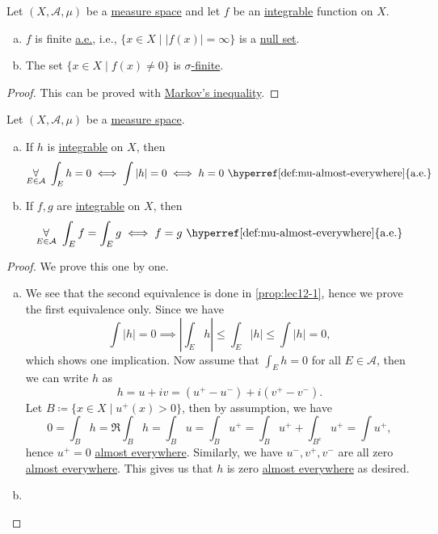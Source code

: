 \begin{lemma}\label{lma:lec-13-2}
	Let \((X, \mathcal{A} , \mu )\) be a \hyperref[def:measure-space]{measure space} and let \(f\) be an \hyperref[def:integrable]{integrable} function on \(X\).
	\begin{enumerate}[(a)]
		\item \(f\) is finite \hyperref[def:mu-almost-everywhere]{a.e.}, i.e., \(\{x\in X \mid \left\vert f(x) \right\vert = \infty \}\) is a \hyperref[def:mu-null-set]{null set}.
		\item The set \(\{x\in X \mid f(x)\neq 0\}\) is \hyperref[def:finite-measure]{\(\sigma \)-finite}.
	\end{enumerate}
\end{lemma}
\begin{proof}
	This can be proved with \hyperref[lma:Markov-inequality]{Markov's inequality}.
\end{proof}

\begin{proposition}\label{prop:lec-13}
	Let \((X, \mathcal{A} , \mu )\) be a \hyperref[def:measure-space]{measure space}.
	\begin{enumerate}[(a)]
		\item If \(h\) is \hyperref[def:integrable]{integrable} on \(X\), then
		      \[
			      \underset{E\in \mathcal{A} }{\forall }\ \int_E h = 0 \iff \int \left\vert h \right\vert = 0 \iff h = 0 \text{ \hyperref[def:mu-almost-everywhere]{a.e.}}
		      \]
		\item If \(f, g\) are \hyperref[def:integrable]{integrable} on \(X\), then
		      \[
			      \underset{E\in \mathcal{A} }{\forall }\ \int _E f = \int _E g \iff f = g \text{ \hyperref[def:mu-almost-everywhere]{a.e.}}
		      \]
	\end{enumerate}
\end{proposition}
\begin{proof}
	We prove this one by one.
	\begin{enumerate}[(a)]
		\item We see that the second equivalence is done in \autoref{prop:lec12-1}, hence we prove the first equivalence only. Since we have
		      \[
			      \int \left\vert h \right\vert = 0 \implies \left\vert \int _E h \right\vert \leq \int _E \left\vert h \right\vert \leq \int \left\vert h \right\vert = 0,
		      \]
		      which shows one implication. Now assume that \(\int _E h = 0\) for all \(E\in \mathcal{A} \), then we can write \(h\) as
		      \[
			      h = u + iv = (u^+ - u^-) + i (v^+ - v^-).
		      \]
		      Let \(B\coloneqq \{x\in X \mid u^+(x)>0\}\), then by assumption, we have
		      \[
			      0 = \int _B h = \Re \int _B h = \int _B u = \int _B u^+ = \int _B u^+ + \int _{B^{c}} u^+ = \int u^+,
		      \]
		      hence \(u^+ = 0\) \hyperref[def:mu-almost-everywhere]{almost everywhere}. Similarly, we have \(u^-, v^+, v^-\) are all zero \hyperref[def:mu-almost-everywhere]{almost everywhere}. This gives us that \(h\) is zero  \hyperref[def:mu-almost-everywhere]{almost everywhere} as desired.
		\item {}
	\end{enumerate}
\end{proof}

